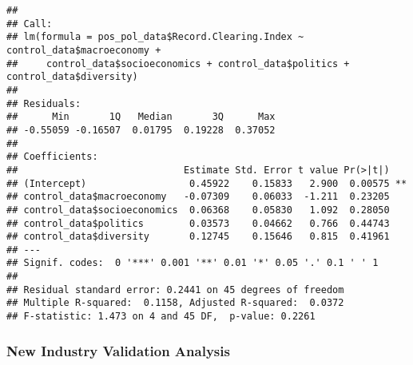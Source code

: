 \documentclass[
]{article}
\newenvironment{Shaded}{\begin{snugshade}}{\end{snugshade}}
\newcommand{\CommentTok}[1]{\textcolor[rgb]{0.56,0.35,0.01}{\textit{#1}}}
\newcommand{\FunctionTok}[1]{\textcolor[rgb]{0.13,0.29,0.53}{\textbf{#1}}}
\newcommand{\NormalTok}[1]{#1}
\newcommand{\OtherTok}[1]{\textcolor[rgb]{0.56,0.35,0.01}{#1}}
\newcommand{\SpecialCharTok}[1]{\textcolor[rgb]{0.81,0.36,0.00}{\textbf{#1}}}
\begin{document}
\begin{Shaded}
\end{Shaded}

\begin{verbatim}
## 
## Call:
## lm(formula = pos_pol_data$Record.Clearing.Index ~ control_data$macroeconomy + 
##     control_data$socioeconomics + control_data$politics + control_data$diversity)
## 
## Residuals:
##      Min       1Q   Median       3Q      Max 
## -0.55059 -0.16507  0.01795  0.19228  0.37052 
## 
## Coefficients:
##                             Estimate Std. Error t value Pr(>|t|)   
## (Intercept)                  0.45922    0.15833   2.900  0.00575 **
## control_data$macroeconomy   -0.07309    0.06033  -1.211  0.23205   
## control_data$socioeconomics  0.06368    0.05830   1.092  0.28050   
## control_data$politics        0.03573    0.04662   0.766  0.44743   
## control_data$diversity       0.12745    0.15646   0.815  0.41961   
## ---
## Signif. codes:  0 '***' 0.001 '**' 0.01 '*' 0.05 '.' 0.1 ' ' 1
## 
## Residual standard error: 0.2441 on 45 degrees of freedom
## Multiple R-squared:  0.1158, Adjusted R-squared:  0.0372 
## F-statistic: 1.473 on 4 and 45 DF,  p-value: 0.2261
\end{verbatim}

\subsubsection{New Industry Validation
Analysis}\label{new-industry-validation-analysis}
\end{document}
